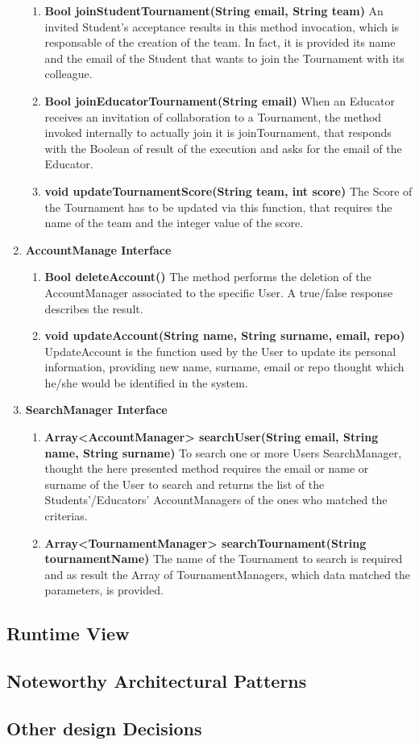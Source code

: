 \begin{enumerate}
\begin{enumerate}[label=$\bullet$]
        \item \textbf{Bool joinStudentTournament(String email, String team)} An invited Student's acceptance results in this method invocation, which is responsable of the creation of the team. In fact, it is provided its name and the email of the Student that wants to join the Tournament with its colleague.
        \item \textbf{Bool joinEducatorTournament(String email)} When an Educator receives an invitation of collaboration to a Tournament, the method invoked internally to actually join it is joinTournament, that responds with the Boolean of result of the execution and asks for the email of the Educator.
        \item \textbf{void updateTournamentScore(String team, int score)} The Score of the Tournament has to be updated via this function, that requires the name of the team and the integer value of the score.
        \end{enumerate}
    \item \textbf{AccountManage Interface} 
        \begin{enumerate}[label=$\bullet$]
            \item \textbf{Bool deleteAccount()} The method performs the deletion of the AccountManager associated to the specific User. A true/false response describes the result.
            \item \textbf{void updateAccount(String name, String surname, email, repo)} UpdateAccount is the function used by the User to update its personal information, providing new name, surname, email or repo thought which he/she would be identified in the system.
        \end{enumerate}
    \item \textbf{SearchManager Interface} 
        \begin{enumerate}[label=$\bullet$]
            \item \textbf{Array<AccountManager> searchUser(String email, String name, String surname)} To search one or more Users SearchManager, thought the here presented method requires the email or name or surname of the User to search and returns the list of the Students'/Educators' AccountManagers of the ones who matched the criterias.
            \item \textbf{Array<TournamentManager> searchTournament(String tournamentName)} The name of the Tournament to search is required and as result the Array of TournamentManagers, which data matched the parameters, is provided.
        \end{enumerate}
\end{enumerate}
\subsection{Runtime View}
\subsection{Noteworthy Architectural Patterns}
\subsection{Other design Decisions}